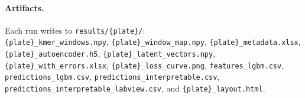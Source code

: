 \paragraph{Artifacts.} Each run writes to \texttt{results/\{plate\}/}:\\
\texttt{\{plate\}\_kmer\_windows.npy}, \texttt{\{plate\}\_window\_map.npy}, \texttt{\{plate\}\_metadata.xlsx}, \texttt{\{plate\}\_autoencoder.h5}, \texttt{\{plate\}\_latent\_vectors.npy}, \texttt{\{plate\}\_with\_errors.xlsx}, \texttt{\{plate\}\_loss\_curve.png}, \texttt{features\_lgbm.csv}, \texttt{predictions\_lgbm.csv}, \texttt{predictions\_interpretable.csv}, \texttt{predictions\_interpretable\_labview.csv}, and \texttt{\{plate\}\_layout.html}.
